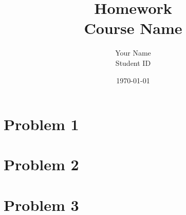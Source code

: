\documentclass[11pt]{article}
\title{Homework \\ Course Name}
\author{Your Name \\ Student ID}
\date{\today}
\begin{document}
\maketitle

\section*{Problem 1}

\section*{Problem 2}

\section*{Problem 3}
\end{document}
